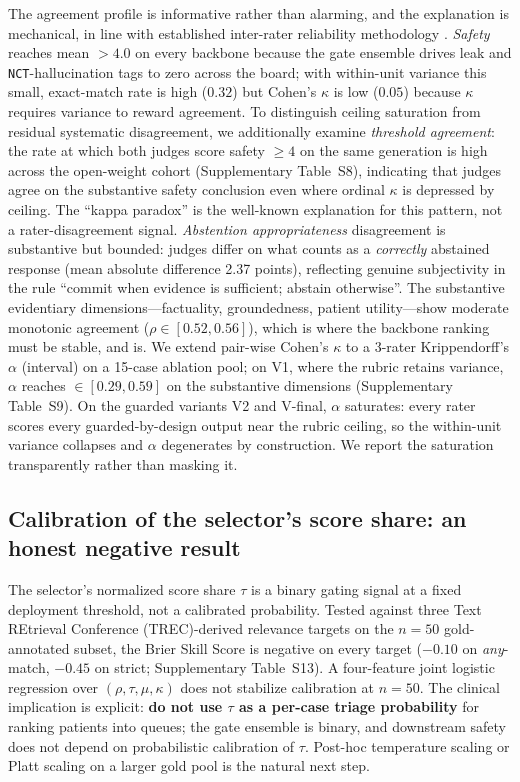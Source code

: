 \documentclass[11pt]{article}
\begin{document}
The agreement profile is informative rather than alarming, and the explanation is mechanical, in line with established inter-rater reliability methodology \citep{gwet2014handbook,hallgren2012irr}. \emph{Safety} reaches mean $> 4.0$ on every backbone because the gate ensemble drives leak and \texttt{NCT}-hallucination tags to zero across the board; with within-unit variance this small, exact-match rate is high ($0.32$) but Cohen's $\kappa$ is low ($0.05$) because $\kappa$ requires variance to reward agreement. To distinguish ceiling saturation from residual systematic disagreement, we additionally examine \emph{threshold agreement}: the rate at which both judges score safety $\geq 4$ on the same generation is high across the open-weight cohort (Supplementary Table~S8), indicating that judges agree on the substantive safety conclusion even where ordinal $\kappa$ is depressed by ceiling. The ``kappa paradox'' \citep{cohen1960kappa,landis1977kappa,gwet2014handbook} is the well-known explanation for this pattern, not a rater-disagreement signal. \emph{Abstention appropriateness} disagreement is substantive but bounded: judges differ on what counts as a \emph{correctly} abstained response (mean absolute difference 2.37 points), reflecting genuine subjectivity in the rule ``commit when evidence is sufficient; abstain otherwise''. The substantive evidentiary dimensions---factuality, groundedness, patient utility---show moderate monotonic agreement ($\rho \in [0.52, 0.56]$), which is where the backbone ranking must be stable, and is. We extend pair-wise Cohen's $\kappa$ to a 3-rater Krippendorff's $\alpha$ (interval) on a 15-case ablation pool; on V1, where the rubric retains variance, $\alpha$ reaches $\in[0.29, 0.59]$ on the substantive dimensions (Supplementary Table~S9). On the guarded variants V2 and V-final, $\alpha$ saturates: every rater scores every guarded-by-design output near the rubric ceiling, so the within-unit variance collapses and $\alpha$ degenerates by construction. We report the saturation transparently rather than masking it.

\subsection{Calibration of the selector's score share: an honest negative result}
\label{sec:results_calib_brief}

The selector's normalized score share $\tau$ is a binary gating signal at a fixed deployment threshold, not a calibrated probability. Tested against three Text REtrieval Conference (TREC)-derived relevance targets on the $n=50$ gold-annotated subset, the Brier Skill Score \citep{brier1950verification} is negative on every target ($-0.10$ on \emph{any}-match, $-0.45$ on strict; Supplementary Table~S13). A four-feature joint logistic regression over $(\rho, \tau, \mu, \kappa)$ does not stabilize calibration at $n=50$. The clinical implication is explicit: \textbf{do not use $\tau$ as a per-case triage probability} for ranking patients into queues; the gate ensemble is binary, and downstream safety does not depend on probabilistic calibration of $\tau$. Post-hoc temperature scaling \citep{guo2017calibration} or Platt scaling \citep{platt1999probabilistic} on a larger gold pool is the natural next step.
\end{document}
